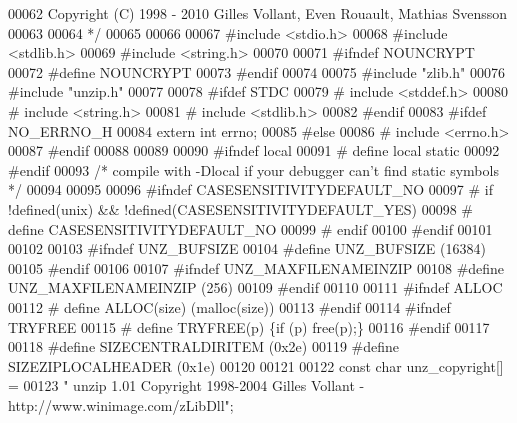 \begin{DoxyCode}
00062 \textcolor{comment}{  Copyright (C) 1998 - 2010 Gilles Vollant, Even Rouault, Mathias Svensson}
00063 \textcolor{comment}{}
00064 \textcolor{comment}{*/}
00065 
00066 
00067 \textcolor{preprocessor}{#include <stdio.h>}
00068 \textcolor{preprocessor}{#include <stdlib.h>}
00069 \textcolor{preprocessor}{#include <string.h>}
00070 
00071 \textcolor{preprocessor}{#ifndef NOUNCRYPT}
00072 \textcolor{preprocessor}{        #define NOUNCRYPT}
00073 \textcolor{preprocessor}{#endif}
00074 
00075 \textcolor{preprocessor}{#include "zlib.h"}
00076 \textcolor{preprocessor}{#include "unzip.h"}
00077 
00078 \textcolor{preprocessor}{#ifdef STDC}
00079 \textcolor{preprocessor}{#  include <stddef.h>}
00080 \textcolor{preprocessor}{#  include <string.h>}
00081 \textcolor{preprocessor}{#  include <stdlib.h>}
00082 \textcolor{preprocessor}{#endif}
00083 \textcolor{preprocessor}{#ifdef NO\_ERRNO\_H}
00084     \textcolor{keyword}{extern} \textcolor{keywordtype}{int} errno;
00085 \textcolor{preprocessor}{#else}
00086 \textcolor{preprocessor}{#   include <errno.h>}
00087 \textcolor{preprocessor}{#endif}
00088 
00089 
00090 \textcolor{preprocessor}{#ifndef local}
00091 \textcolor{preprocessor}{#  define local static}
00092 \textcolor{preprocessor}{#endif}
00093 \textcolor{comment}{/* compile with -Dlocal if your debugger can't find static symbols */}
00094 
00095 
00096 \textcolor{preprocessor}{#ifndef CASESENSITIVITYDEFAULT\_NO}
00097 \textcolor{preprocessor}{#  if !defined(unix) && !defined(CASESENSITIVITYDEFAULT\_YES)}
00098 \textcolor{preprocessor}{#    define CASESENSITIVITYDEFAULT\_NO}
00099 \textcolor{preprocessor}{#  endif}
00100 \textcolor{preprocessor}{#endif}
00101 
00102 
00103 \textcolor{preprocessor}{#ifndef UNZ\_BUFSIZE}
00104 \textcolor{preprocessor}{#define UNZ\_BUFSIZE (16384)}
00105 \textcolor{preprocessor}{#endif}
00106 
00107 \textcolor{preprocessor}{#ifndef UNZ\_MAXFILENAMEINZIP}
00108 \textcolor{preprocessor}{#define UNZ\_MAXFILENAMEINZIP (256)}
00109 \textcolor{preprocessor}{#endif}
00110 
00111 \textcolor{preprocessor}{#ifndef ALLOC}
00112 \textcolor{preprocessor}{# define ALLOC(size) (malloc(size))}
00113 \textcolor{preprocessor}{#endif}
00114 \textcolor{preprocessor}{#ifndef TRYFREE}
00115 \textcolor{preprocessor}{# define TRYFREE(p) \{if (p) free(p);\}}
00116 \textcolor{preprocessor}{#endif}
00117 
00118 \textcolor{preprocessor}{#define SIZECENTRALDIRITEM (0x2e)}
00119 \textcolor{preprocessor}{#define SIZEZIPLOCALHEADER (0x1e)}
00120 
00121 
00122 \textcolor{keyword}{const} \textcolor{keywordtype}{char} unz\_copyright[] =
00123    \textcolor{stringliteral}{" unzip 1.01 Copyright 1998-2004 Gilles Vollant - http://www.winimage.com/zLibDll"};

\end{DoxyCode}
